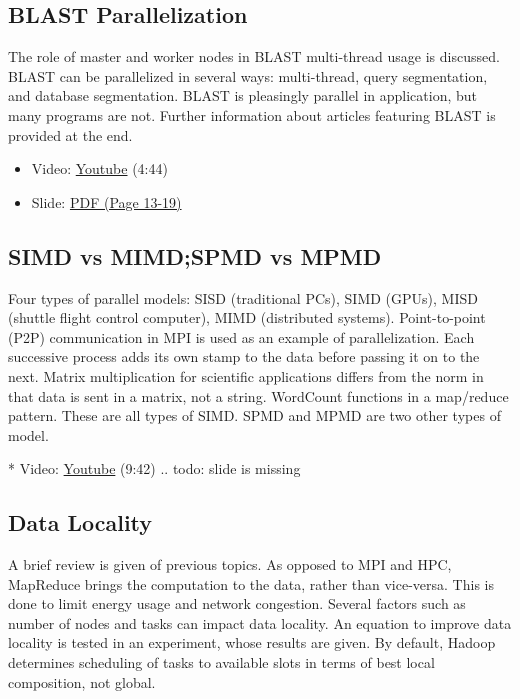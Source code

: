 \subsection{BLAST Parallelization}\label{blast-parallelization}

The role of master and worker nodes in BLAST multi-thread usage is
discussed. BLAST can be parallelized in several ways: multi-thread,
query segmentation, and database segmentation. BLAST is pleasingly
parallel in application, but many programs are not. Further information
about articles featuring BLAST is provided at the end.

\begin{itemize}

\item
  Video: \href{https://www.youtube.com/watch?v=isc0MjkwTlk}{Youtube}
  (4:44)
\item
  Slide:
  \href{https://drive.google.com/open?id=0B88HKpainTSfdnFvY1V3dlFTRlE}{PDF
  (Page 13-19)}
\end{itemize}

\subsection{SIMD vs MIMD;SPMD vs MPMD}\label{simd-vs-mimdspmd-vs-mpmd}

Four types of parallel models: SISD (traditional PCs), SIMD (GPUs), MISD
(shuttle flight control computer), MIMD (distributed systems).
Point-to-point (P2P) communication in MPI is used as an example of
parallelization. Each successive process adds its own stamp to the data
before passing it on to the next. Matrix multiplication for scientific
applications differs from the norm in that data is sent in a matrix, not
a string. WordCount functions in a map/reduce pattern. These are all
types of SIMD. SPMD and MPMD are two other types of model.

* Video: \href{https://www.youtube.com/watch?v=zHQiR56Zmtc}{Youtube}
(9:42) .. todo: slide is missing

\subsection{Data Locality}\label{data-locality}

A brief review is given of previous topics. As opposed to MPI and HPC,
MapReduce brings the computation to the data, rather than vice-versa.
This is done to limit energy usage and network congestion. Several
factors such as number of nodes and tasks can impact data locality. An
equation to improve data locality is tested in an experiment, whose
results are given. By default, Hadoop determines scheduling of tasks to
available slots in terms of best local composition, not global.

